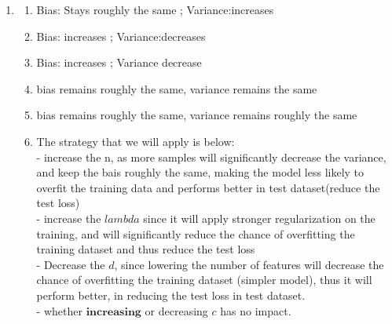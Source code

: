 \documentclass[12pt]{article}
\begin{document}
\begin{enumerate}
\item 
\begin{enumerate}
\item Bias: Stays roughly the same ; Variance:increases
\item Bias: increases ; Variance:decreases 
\item Bias: increases ; Variance decrease 
\item bias remains roughly the same, variance remains the same
\item bias remains roughly the same, variance remains roughly the same
\item 
The strategy that we will apply is below: \\
- increase the n, as more samples will significantly decrease the variance, and keep the bais roughly the same, making the model less likely to overfit the training data and performs better in test dataset(reduce the test loss) \\
- increase the \( lambda \) since it will apply stronger regularization on the training, and will significantly reduce the chance of overfitting the training dataset and thus reduce the test loss \\
- Decrease the \( d \), since lowering the number of features will decrease the chance of overfitting the training dataset (simpler model), thus it will perform better, in reducing the test loss in test dataset. \\
- whether \(\mathbf{increasing}\) or decreasing \( c \) has no impact.
\end{enumerate}


\end{enumerate}
\end{document}
